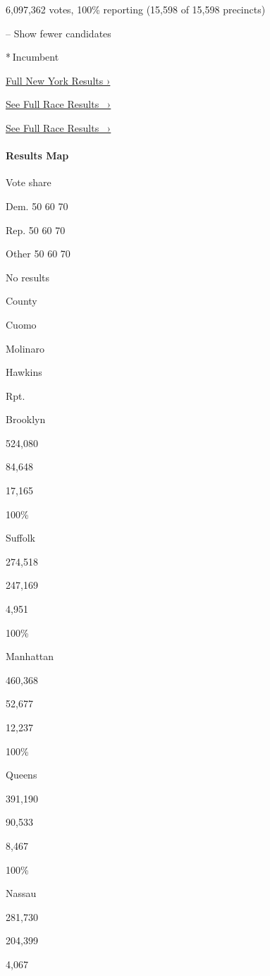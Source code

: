 6,097,362 votes, 100\% reporting (15,598 of 15,598 precincts)

-- Show fewer candidates

* Incumbent

\href{https://www.nytimes3xbfgragh.onion/interactive/2018/11/06/us/elections/results-new-york-elections.html}{Full
New York Results ›}

\href{https://www.nytimes3xbfgragh.onion/elections/results/new-york-governor}{See
Full Race Results~ ›}

\href{https://www.nytimes3xbfgragh.onion/elections/results/new-york-governor}{See
Full Race Results~ ›}

\hypertarget{results-map-1}{%
\paragraph{Results Map}\label{results-map-1}}

Vote share

Dem. 50 60 70

Rep. 50 60 70

Other 50 60 70

No results

County

Cuomo

Molinaro

Hawkins

Rpt.

Brooklyn

524,080

84,648

17,165

100\%

Suffolk

274,518

247,169

4,951

100\%

Manhattan

460,368

52,677

12,237

100\%

Queens

391,190

90,533

8,467

100\%

Nassau

281,730

204,399

4,067

